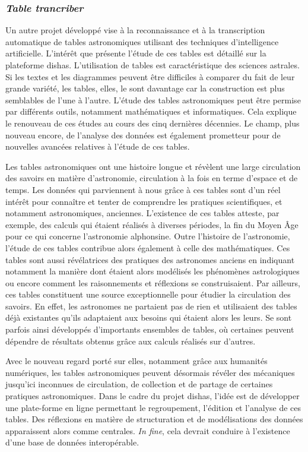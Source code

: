 	\subsubsection{\textit{Table trancriber}}
	Un autre projet développé vise à la reconnaissance et à la transcription automatique de tables astronomiques utilisant des techniques d’intelligence artificielle. L’intérêt que présente l’étude de ces tables est détaillé sur la plateforme \acrshort{dishas}. L’utilisation de tables est caractéristique des sciences astrales. Si les textes et les diagrammes peuvent être difficiles à comparer du fait de leur grande variété, les tables, elles, le sont davantage car la construction est plus semblables de l’une à l’autre. L’étude des tables astronomiques peut être permise par différents outils, notamment mathématiques et informatiques. Cela explique le renouveau de ces études au cours des cinq dernières décennies. Le champ, plus nouveau encore, de l’analyse des données est également prometteur pour de nouvelles avancées relatives à l’étude de ces tables. 
	
	Les tables astronomiques ont une histoire longue et révèlent une large circulation des savoirs en matière d’astronomie, circulation à la fois en terme d’espace et de temps. Les données qui parviennent à nous grâce à ces tables sont d’un réel intérêt pour connaître et tenter de comprendre les pratiques scientifiques, et notamment astronomiques, anciennes. L’existence de ces tables atteste, par exemple, des calculs qui étaient réalisés à diverses périodes, la fin du Moyen Âge pour ce qui concerne l’astronomie alphonsine. Outre l’histoire de l’astronomie, l’étude de ces tables contribue alors également à celle des mathématiques. Ces tables sont aussi révélatrices des pratiques des astronomes anciens en indiquant notamment la manière dont étaient alors modélisés les phénomènes astrologiques ou encore comment les raisonnements et réflexions se construisaient. Par ailleurs, ces tables constituent une source exceptionnelle pour étudier la circulation des savoirs. En effet, les astronomes ne partaient pas de rien et utilisaient des tables déjà existantes qu’ils adaptaient aux besoins qui étaient alors les leurs. Se sont parfois ainsi développés d’importants ensembles de tables, où certaines peuvent dépendre de résultats obtenus grâce aux calculs réalisés sur d’autres.
	
	Avec le nouveau regard porté sur elles, notamment grâce aux humanités numériques, les tables astronomiques peuvent désormais révéler des mécaniques jusqu’ici inconnues de circulation, de collection et de partage de certaines pratiques astronomiques. Dans le cadre du projet \acrshort{dishas}, l’idée est de développer une plate-forme en ligne permettant le regroupement, l’édition et l’analyse de ces tables. Des réflexions en matière de structuration et de modélisations des données apparaissent alors comme centrales. \textit{In fine}, cela devrait conduire à l’existence d’une base de données interopérable. 
	
